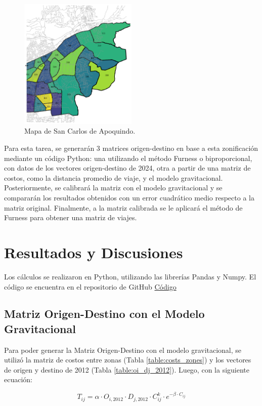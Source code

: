 \documentclass[letterpaper,12pt]{article}
\begin{document}
\begin{figure}[h!]
    \centering
    \includegraphics[width=0.5\textwidth]{fotos/mapa.png}
    \caption{Mapa de San Carlos de Apoquindo.}
    \label{fig:mapa}
\end{figure}

Para esta tarea, se generarán 3 matrices origen-destino en base a esta zonificación mediante un código Python: una utilizando el método Furness o biproporcional, con datos de los vectores origen-destino de 2024, otra a partir de una matriz de costos, como la distancia promedio de viaje, y el modelo gravitacional. Posteriormente, se calibrará la matriz con el modelo gravitacional y se compararán los resultados obtenidos con un error cuadrático medio respecto a la matriz original. Finalmente, a la matriz calibrada se le aplicará el método de Furness para obtener una matriz de viajes.



\section{Resultados y Discusiones}
Los cálculos se realizaron en Python, utilizando las librerías Pandas y Numpy. El código se encuentra en el repositorio de GitHub \href{https://github.com/berckanala/T3_autitos/blob/main/t3.py}{Código}
\subsection{Matriz Origen-Destino con el Modelo Gravitacional}
Para poder generar la Matriz Origen-Destino con el modelo gravitacional, se utilizó la matriz de costos entre zonas (Tabla \ref{table:costs_zones}) y los vectores de origen y destino de 2012 (Tabla \ref{table:oi_dj_2012}). Luego, con la siguiente ecuación: 

\begin{equation}
    T_{ij} = \alpha \cdot O_{i,2012} \cdot D_{j,2012} \cdot C_{ij}^k \cdot e^{-\beta \cdot C_{ij}}
\end{equation}
\end{document}
